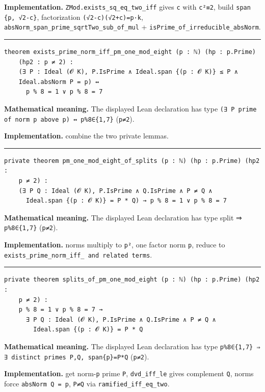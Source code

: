 \documentclass[UTF8,a4paper,11pt,fontset=fandol]{ctexart}
\theoremstyle{definition}
\newcommand{\statementsep}{\par\medskip\hrule\medskip}
\begin{document}
\noindent\textbf{Implementation.} \texttt{ZMod.\allowbreak{}exists\_\allowbreak{}sq\_\allowbreak{}eq\_\allowbreak{}two\_\allowbreak{}iff} gives \texttt{c} with \texttt{c²≡2}, build \texttt{span \{p, √2-c\}}, factorization \texttt{(√2-c)(√2+c)=p·k}, \texttt{absNorm\_\allowbreak{}span\_\allowbreak{}prime\_\allowbreak{}sqrtTwo\_\allowbreak{}sub\_\allowbreak{}of\_\allowbreak{}mul} + \texttt{isPrime\_\allowbreak{}of\_\allowbreak{}irreducible\_\allowbreak{}absNorm}.\par
\statementsep
\begin{verbatim}
theorem exists_prime_norm_iff_pm_one_mod_eight (p : ℕ) (hp : p.Prime)
    (hp2 : p ≠ 2) :
    (∃ P : Ideal (𝓞 K), P.IsPrime ∧ Ideal.span {(p : 𝓞 K)} ≤ P ∧
    Ideal.absNorm P = p) ↔
      p % 8 = 1 ∨ p % 8 = 7
\end{verbatim}
\noindent\textbf{Mathematical meaning.} The displayed Lean declaration has type \texttt{(∃ P prime of norm p above p) ↔ p\%8∈\{1,7\}} (\texttt{p≠2}).\par
\noindent\textbf{Implementation.} combine the two private lemmas.\par
\statementsep
\begin{verbatim}
private theorem pm_one_mod_eight_of_splits (p : ℕ) (hp : p.Prime) (hp2 :
    p ≠ 2) :
    (∃ P Q : Ideal (𝓞 K), P.IsPrime ∧ Q.IsPrime ∧ P ≠ Q ∧
      Ideal.span {(p : 𝓞 K)} = P * Q) → p % 8 = 1 ∨ p % 8 = 7
\end{verbatim}
\noindent\textbf{Mathematical meaning.} The displayed Lean declaration has type split ⇒ \texttt{p\%8∈\{1,7\}} (\texttt{p≠2}).\par
\noindent\textbf{Implementation.} norms multiply to \texttt{p²}, one factor norm \texttt{p}, reduce to \texttt{exists\_\allowbreak{}prime\_\allowbreak{}norm\_\allowbreak{}iff\_\allowbreak{} and related terms}.\par
\statementsep
\begin{verbatim}
private theorem splits_of_pm_one_mod_eight (p : ℕ) (hp : p.Prime) (hp2 :
    p ≠ 2) :
    p % 8 = 1 ∨ p % 8 = 7 →
      ∃ P Q : Ideal (𝓞 K), P.IsPrime ∧ Q.IsPrime ∧ P ≠ Q ∧
        Ideal.span {(p : 𝓞 K)} = P * Q
\end{verbatim}
\noindent\textbf{Mathematical meaning.} The displayed Lean declaration has type \texttt{p\%8∈\{1,7\} ⇒ ∃ distinct primes P,Q, span\{p\}=P*Q} (\texttt{p≠2}).\par
\noindent\textbf{Implementation.} get norm-\texttt{p} prime \texttt{P}, \texttt{dvd\_\allowbreak{}iff\_\allowbreak{}le} gives complement \texttt{Q}, norms force \texttt{absNorm Q = p}, \texttt{P≠Q} via \texttt{ramified\_\allowbreak{}iff\_\allowbreak{}eq\_\allowbreak{}two}.\par
\end{document}
